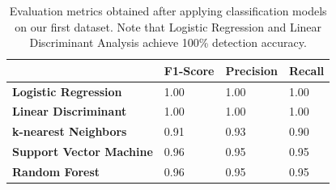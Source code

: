 \documentclass[acmlarge]{acmart}
\newcommand{\vs}[1]{{\vspace{-#1mm}}}
\begin{document}
\begin{table}[t]
\small
\begin{center}
\caption{Evaluation metrics obtained after applying classification models on our first dataset. Note that Logistic Regression and Linear Discriminant Analysis achieve 100\% detection accuracy.}

\begin{tabular}{llll}
                                                   & \textbf{F1-Score}         & \textbf{Precision}        & \textbf{Recall}           \\ \hline
\multicolumn{1}{l|}{\textbf{Logistic Regression}} & \multicolumn{1}{l|}{1.00} & \multicolumn{1}{l|}{1.00} & \multicolumn{1}{l}{1.00} \\ \hline
\multicolumn{1}{l|}{\textbf{Linear Discriminant}} & \multicolumn{1}{l|}{1.00} & \multicolumn{1}{l|}{1.00} & \multicolumn{1}{l}{1.00} \\ \hline
\multicolumn{1}{l|}{\textbf{k-nearest Neighbors}} & \multicolumn{1}{l|}{0.91} & \multicolumn{1}{l|}{0.93} & \multicolumn{1}{l}{0.90} \\ \hline
\multicolumn{1}{l|}{\textbf{Support Vector Machine}} & \multicolumn{1}{l|}{0.96} & \multicolumn{1}{l|}{0.95} & \multicolumn{1}{l}{0.95} \\ \hline
\multicolumn{1}{l|}{\textbf{Random Forest}} & \multicolumn{1}{l|}{0.96} & \multicolumn{1}{l|}{0.95} & \multicolumn{1}{l}{0.95} \\ \hline
\end{tabular}
\vs{0}
\label{tab:confusionmatrix}  
\end{center}
\end{table}
\end{document}
